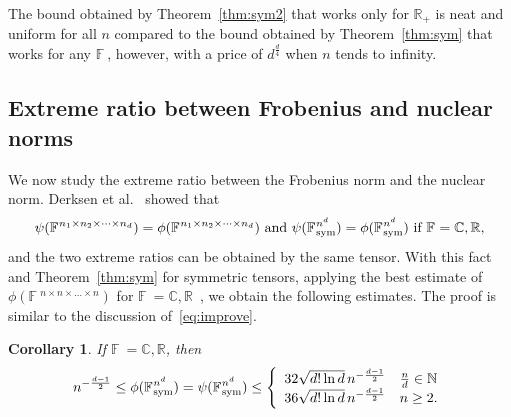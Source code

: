 \documentclass[11pt]{article}
\newtheorem{corollary}[theorem]{Corollary}
\newcommand{\C}{\mathbb{C}}
\newcommand{\R}{\mathbb{R}}
\newcommand{\N}{\mathbb{N}}
\newcommand{\BF}{\mathbb{F}\:\!}
\newcommand{\sym}{\textnormal{sym}}
\begin{document}
The bound obtained by Theorem~\ref{thm:sym2} that works only for $\R_+$ is neat and uniform for all $n$ compared to the bound obtained by Theorem~\ref{thm:sym} that works for any $\BF$, however, with a price of $d^{\frac{d}{4}}$ when $n$ tends to infinity.

\subsection{Extreme ratio between Frobenius and nuclear norms}

We now study the extreme ratio between the Frobenius norm and the nuclear norm. Derksen et al.~\cite{DFLW17} showed that
\begin{equation}\label{eq:nuclear}
\psi(\BF^{n_1\times n_2\times \dots \times n_d})=\phi(\BF^{n_1\times n_2\times \dots \times n_d}) \mbox{ and } \psi(\BF^{n^d}_\sym)= \phi(\BF^{n^d}_\sym) \mbox{ if }\BF=\C,\R,
\end{equation}
and the two extreme ratios can be obtained by the same tensor. With this fact and Theorem~\ref{thm:sym} for symmetric tensors, applying the best estimate of $\phi(\BF^{n\times n\times \dots\times n})$ for $\BF=\C,\R$~\cite[Theorem 1.1]{KT22}, we obtain the following estimates. The proof is similar to the discussion of~\eqref{eq:improve}.
\begin{corollary} \label{thm:nuclearsym}
If $\BF=\C,\R$, then
$$
 n^{-\frac{d-1}{2}}\le \phi(\BF^{n^d}_\sym) = \psi(\BF^{n^d}_\sym) \le\left\{
 \begin{array}{ll}
   32\sqrt{d!\ln d}\,n^{-\frac{d-1}{2}}   & \frac{n}{d}\in\N \\
   36\sqrt{d!\ln d}\,n^{-\frac{d-1}{2}}   & n\ge2.
 \end{array}\right.
 $$
\end{corollary}
\end{document}
